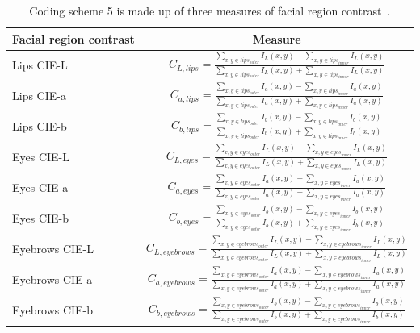 \documentclass[letterpaper,11pt]{article}
\begin{document}
\begin{table}[htbp]
\centering
\begin{tabular}{|l|c|}
    \hline 
    \bf Facial region contrast    & \bf Measure\\\hline\hline
    Lips CIE-L&   $C_{L,lips} = \frac{\sum_{x,y\in lips_{outer}} I_{L}(x,y) - \sum_{x,y\in lips_{inner}} I_{L}(x,y)}{\sum_{x,y\in lips_{outer}} I_{L}(x,y) + \sum_{x,y\in lips_{inner}} I_{L}(x,y)}$\\\hline
    Lips CIE-a&   $C_{a,lips} = \frac{\sum_{x,y\in lips_{outer}} I_{a}(x,y) - \sum_{x,y\in lips_{inner}} I_{a}(x,y)}{\sum_{x,y\in lips_{outer}} I_{a}(x,y) + \sum_{x,y\in lips_{inner}} I_{a}(x,y)}$\\\hline
    Lips CIE-b&   $C_{b,lips} = \frac{\sum_{x,y\in lips_{outer}} I_{b}(x,y) - \sum_{x,y\in lips_{inner}} I_{b}(x,y)}{\sum_{x,y\in lips_{outer}} I_{b}(x,y) + \sum_{x,y\in lips_{inner}} I_{b}(x,y)}$\\\hline
    Eyes CIE-L&   $C_{L,eyes} = \frac{\sum_{x,y\in eyes_{outer}} I_{L}(x,y) - \sum_{x,y\in eyes_{inner}} I_{L}(x,y)}{\sum_{x,y\in eyes_{outer}} I_{L}(x,y) + \sum_{x,y\in eyes_{inner}} I_{L}(x,y)}$\\\hline
    Eyes CIE-a&   $C_{a,eyes} = \frac{\sum_{x,y\in eyes_{outer}} I_{a}(x,y) - \sum_{x,y\in eyes_{inner}} I_{a}(x,y)}{\sum_{x,y\in eyes_{outer}} I_{a}(x,y) + \sum_{x,y\in eyes_{inner}} I_{a}(x,y)}$\\\hline
    Eyes CIE-b&   $C_{b,eyes} = \frac{\sum_{x,y\in eyes_{outer}} I_{b}(x,y) - \sum_{x,y\in eyes_{inner}} I_{b}(x,y)}{\sum_{x,y\in eyes_{outer}} I_{b}(x,y) + \sum_{x,y\in eyes_{inner}} I_{b}(x,y)}$\\\hline
    Eyebrows CIE-L&   $C_{L,eyebrows} = \frac{\sum_{x,y\in eyebrows_{outer}} I_{L}(x,y) - \sum_{x,y\in eyebrows_{inner}} I_{L}(x,y)}{\sum_{x,y\in eyebrows_{outer}} I_{L}(x,y) + \sum_{x,y\in eyebrows_{inner}} I_{L}(x,y)}$\\\hline
    Eyebrows CIE-a&   $C_{a,eyebrows} = \frac{\sum_{x,y\in eyebrows_{outer}} I_{a}(x,y) - \sum_{x,y\in eyebrows_{inner}} I_{a}(x,y)}{\sum_{x,y\in eyebrows_{outer}} I_{a}(x,y) + \sum_{x,y\in eyebrows_{inner}} I_{a}(x,y)}$\\\hline
    Eyebrows CIE-b&   $C_{b,eyebrows} = \frac{\sum_{x,y\in eyebrows_{outer}} I_{b}(x,y) - \sum_{x,y\in eyebrows_{inner}} I_{b}(x,y)}{\sum_{x,y\in eyebrows_{outer}} I_{b}(x,y) + \sum_{x,y\in eyebrows_{inner}} I_{b}(x,y)}$\\\hline
    \end{tabular}
    \caption{Coding scheme 5 is made up of three measures of facial region contrast~\cite{facial_contrast17}.}
    \label{tab:contrast}
\end{table}
\end{document}
